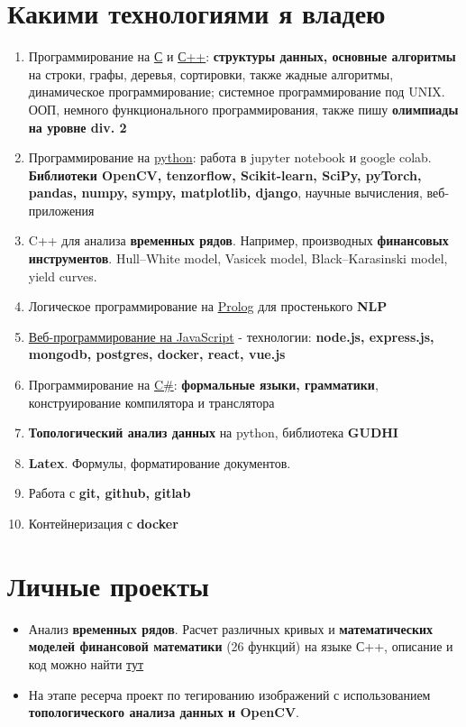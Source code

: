 \documentclass[a4paper,12pt]{article}
\begin{document}
\section{Какими технологиями я владею}
\begin{enumerate}
    \item Программирование на \underline{С} и \underline{С++}: \textbf{структуры данных, основные алгоритмы} на строки, графы, деревья, сортировки, также жадные алгоритмы, динамическое программирование; системное программирование под UNIX. ООП, немного функционального программирования, также пишу \textbf{олимпиады на уровне div. 2} 
    \item Программирование на \underline{python}: работа в jupyter notebook и google colab. \textbf{Библиотеки OpenCV, tenzorflow, Scikit-learn, SciPy, pyTorch, pandas, numpy, sympy, matplotlib, django}, научные вычисления, веб-приложения
    \item C++ для анализа \textbf{временных рядов}. Например, производных \textbf{финансовых инструментов}. Hull–White model, Vasicek model, Black–Karasinski model, yield curves.
    \item Логическое программирование на \underline{Prolog} для простенького \textbf{NLP}
    \item \underline{Веб-программирование на JavaScript} - технологии: \textbf{node.js, express.js, mongodb, postgres, docker, react, vue.js}
    \item Программирование на \underline{C\#}: \textbf{формальные языки, грамматики}, конструирование компилятора и транслятора
    \item \textbf{Топологический анализ данных} на python, библиотека \textbf{GUDHI}
    \item \textbf{Latex}. Формулы, форматирование документов.
    \item Работа с \textbf{git, github, gitlab}
    \item Контейнеризация с \textbf{docker}
\end{enumerate}

\section{Личные проекты}
\begin{itemize}
    \item Анализ \textbf{временных рядов}. Расчет различных кривых и \textbf{математических моделей финансовой математики} (26 функций) на языке С++, описание и код можно найти \href{https://github.com/Suraba03/quantaton-2022-preparation}{тут}
    \item На этапе ресерча проект по тегированию изображений с использованием \textbf{топологического анализа данных и OpenCV}.
\end{itemize}
\end{document}
